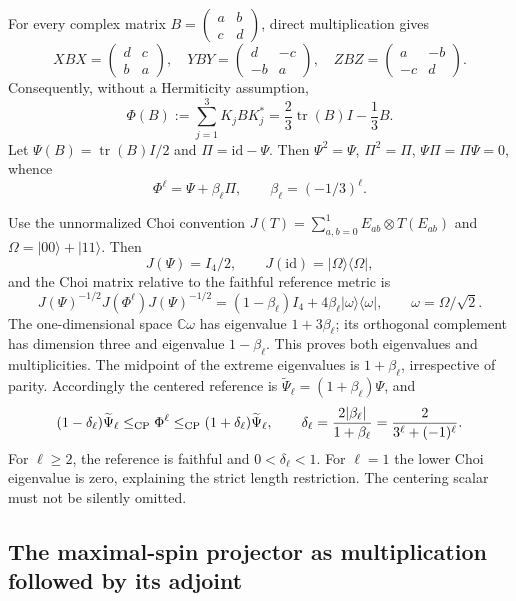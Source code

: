 For every complex matrix $B=\left(\begin{smallmatrix}a&b\\c&d\end{smallmatrix}\right)$,
direct multiplication gives
\[
 XBX=\begin{pmatrix}d&c\\b&a\end{pmatrix},\quad
 YBY=\begin{pmatrix}d&-c\\-b&a\end{pmatrix},\quad
 ZBZ=\begin{pmatrix}a&-b\\-c&d\end{pmatrix}.
\]
Consequently, without a Hermiticity assumption,
\[
 \Phi(B):=\sum_{j=1}^3K_jBK_j^*
 =\frac23\operatorname{tr}(B)I-\frac13B.
\]
Let $\Psi(B)=\operatorname{tr}(B)I/2$ and $\Pi=\mathrm{id}-\Psi$.
Then $\Psi^2=\Psi$, $\Pi^2=\Pi$, $\Psi\Pi=\Pi\Psi=0$, whence
\[
 \Phi^\ell=\Psi+\beta_\ell\Pi,
 \qquad \beta_\ell=(-1/3)^\ell.
\]

Use the unnormalized Choi convention
$J(T)=\sum_{a,b=0}^1E_{ab}\otimes T(E_{ab})$ and
$\Omega=|00\rangle+|11\rangle$. Then
\[
 J(\Psi)=I_4/2,\qquad J(\mathrm{id})=|\Omega\rangle\langle\Omega|,
\]
and the Choi matrix relative to the faithful reference metric is
\[
 J(\Psi)^{-1/2}J(\Phi^\ell)J(\Psi)^{-1/2}
 =(1-\beta_\ell)I_4+4\beta_\ell|\omega\rangle\langle\omega|,
 \qquad \omega=\Omega/\sqrt2.
\]
The one-dimensional space $\mathbb C\omega$ has eigenvalue
$1+3\beta_\ell$; its orthogonal complement has dimension three and
eigenvalue $1-\beta_\ell$. This proves both eigenvalues and multiplicities.
The midpoint of the extreme eigenvalues is $1+\beta_\ell$, irrespective
of parity. Accordingly the centered reference is
\emph{$\widetilde\Psi_\ell=(1+\beta_\ell)\Psi$}, and
\[
 (1-\delta_\ell)\widetilde\Psi_\ell
 \leq_{\rm CP}\Phi^\ell
 \leq_{\rm CP}(1+\delta_\ell)\widetilde\Psi_\ell,
 \qquad
 \delta_\ell=\frac{2|\beta_\ell|}{1+\beta_\ell}
 =\frac2{3^\ell+(-1)^\ell}.
\]
For $\ell\geq2$, the reference is faithful and $0<\delta_\ell<1$.
For $\ell=1$ the lower Choi eigenvalue is zero, explaining the strict
length restriction. The centering scalar must not be silently omitted.

\subsection{The maximal-spin projector as multiplication followed by its adjoint}

